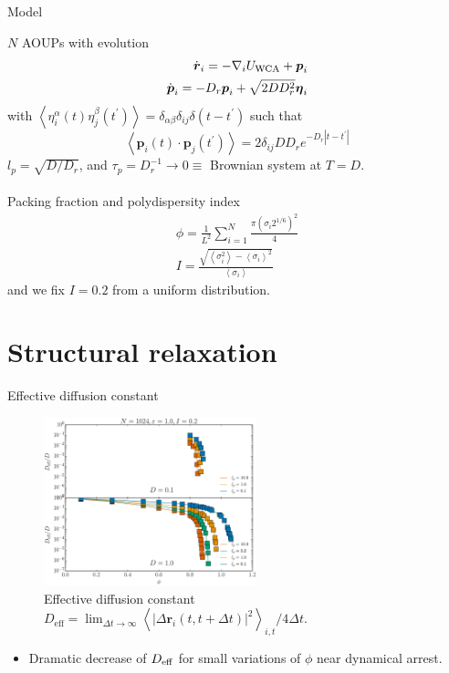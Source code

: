 \documentclass{beamer}
\begin{document}
\begin{frame}{Model}

$N$ AOUPs with evolution
\begin{eqnarray}
\dot{\boldsymbol{r}}_i = -\nabla_i U_{\rm WCA} + \boldsymbol{p}_i\\
\dot{\boldsymbol{p}}_i = - D_r \boldsymbol{p}_i + \sqrt{2 D D_r^2} \boldsymbol{\eta}_i
\end{eqnarray}
with $\left<\eta^{\alpha}_i(t)\eta^{\beta}_j(t^{\prime})\right> = \delta_{\alpha\beta} \delta_{ij} \delta(t - t^{\prime})$ such that
\begin{equation}
\left<\boldsymbol{p}_i(t) \cdot \boldsymbol{p}_j(t^{\prime})\right> = 2 \delta_{ij} D D_r e^{-D_r |t - t^{\prime}|}
\end{equation}
$l_p = \sqrt{D/D_r}$, and $\tau_p = D_r^{-1} \to 0 \equiv$ Brownian system at $T = D$.\\
\mbox{}\\

Packing fraction and polydispersity index
\begin{eqnarray}
\phi = \frac{1}{L^2} \sum_{i=1}^N \frac{\pi (\sigma_i 2^{1/6})^2}{4}\\
I = \frac{\sqrt{\left<\sigma_i^2\right> - \left<\sigma_i\right>^2}}{\left<\sigma_i\right>}
\end{eqnarray}
and we fix $I = 0.2$ from a uniform distribution.

\end{frame}

\section{Structural relaxation}

\begin{frame}{Effective diffusion constant}

\begin{figure}
\centering
\includegraphics[width=0.55\textwidth]{Deff.eps}
\caption{Effective diffusion constant $D_{\mathrm{eff}} = \lim_{\Delta t \to \infty} \left<|\Delta\boldsymbol{r}_i(t, t + \Delta t)|^2\right>_{i, t}/4\Delta t$.}
\end{figure}

\begin{itemize}
  \item Dramatic decrease of $D_{\rm eff}$ for small variations of $\phi$ near dynamical arrest.
\end{itemize}


\end{frame}
\end{document}
